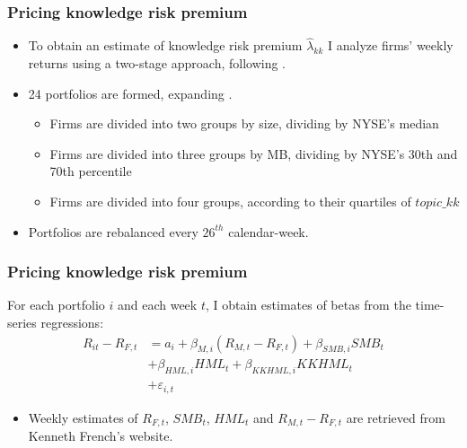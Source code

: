 \documentclass{beamer}
\newcommand{\ffo}{dicfullmc10thr10defnob40noa1_4t}
\newcommand{\insertfigure}[2]{
\begin{figure}[h!]
  \centering
  \texttt{[image: \\ffo/\#1]}
  \centering
  \captionsetup{font=scriptsize}
  \caption{#2}
  \label{fig:#1}
\end{figure}
}
\begin{document}


\begin{frame}
\small 
\frametitle{Pricing knowledge risk premium}
\begin{itemize}
\item To obtain an estimate of knowledge risk premium $\widehat{\lambda}_{kk}$ I analyze firms' weekly returns using a two-stage approach, following \cite{Goyal2012-ct}. 

\item 24 portfolios are formed, expanding \cite{Fama1993-da}. 
\begin{itemize}
	\item Firms are divided into two groups by size, dividing by NYSE's median
	\item Firms are divided into three groups by MB, dividing by NYSE's 30th and 70th percentile
	\item Firms are divided into four groups, according to their quartiles of $topic\_kk$  
\end{itemize}

\item Portfolios are rebalanced every $26^{th}$ calendar-week.
\end{itemize}
\end{frame}

\begin{frame}
\frametitle{Pricing knowledge risk premium}
For each portfolio $i$ and each week $t$, I obtain estimates of betas from the time-series regressions:
	\begin{align*}
		R_{it}-R_{F,t} &= a_i + \beta_{M, i} (R_{M,t}-R_{F,t}) + \beta_{SMB, i} SMB_t \\
		&+\beta_{HML, i} HML_t +\beta_{KKHML, i} KKHML_t \\
		&+\varepsilon_{i,t} 
	\end{align*}
\begin{itemize}
	\item Weekly estimates of $R_{F,t}$, $SMB_t$, $HML_t$ and $R_{M,t}-R_{F,t}$ are retrieved from Kenneth French's website. 
\end{itemize}
\end{frame}
\end{document}
